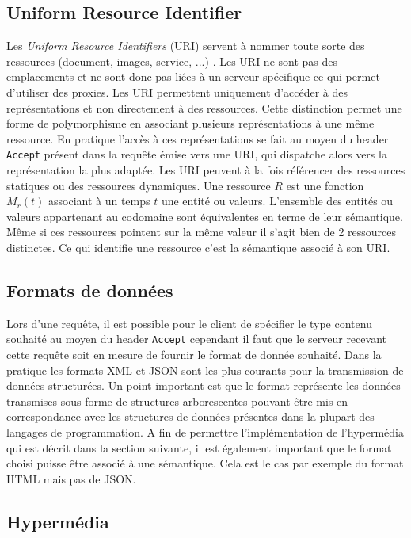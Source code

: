 \documentclass[a4paper, 11pt]{report}
\begin{document}
\subsection{Uniform Resource Identifier}

Les \emph{Uniform Resource Identifiers} (URI) servent à nommer toute
sorte des ressources (document, images, service, ...)
\cite{masinter2005uniform}.  Les URI ne sont pas des emplacements et
ne sont donc pas liées à un serveur spécifique ce qui permet
d'utiliser des proxies.  Les URI permettent uniquement d'accéder à des
représentations et non directement à des ressources.  Cette
distinction permet une forme de polymorphisme en associant plusieurs
représentations à une même ressource.  En pratique l'accès à ces
représentations se fait au moyen du header \verb=Accept= présent dans
la requête émise vers une URI, qui dispatche alors vers la
représentation la plus adaptée.  Les URI peuvent à la fois référencer
des ressources statiques ou des ressources dynamiques.  Une ressource
$R$ est une fonction $M_r(t)$ associant à un temps $t$ une entité ou
valeurs.  L'ensemble des entités ou valeurs appartenant au codomaine
sont équivalentes en terme de leur sémantique.  Même si ces ressources
pointent sur la même valeur il s'agit bien de 2 ressources distinctes.
Ce qui identifie une ressource c'est la sémantique associé à son URI.

\subsection{Formats de données}

Lors d'une requête, il est possible pour le client de spécifier le
type contenu souhaité au moyen du header \verb=Accept= cependant il
faut que le serveur recevant cette requête soit en mesure de fournir
le format de donnée souhaité.  Dans la pratique les formats XML et
JSON sont les plus courants pour la transmission de données
structurées.  Un point important est que le format représente les
données transmises sous forme de structures arborescentes pouvant être
mis en correspondance avec les structures de données présentes dans la
plupart des langages de programmation.  A fin de permettre
l'implémentation de l'hypermédia qui est décrit dans la section
suivante, il est également important que le format choisi puisse être
associé à une sémantique. Cela est le cas par exemple du format HTML
mais pas de JSON.

\subsection{Hypermédia}
\end{document}
